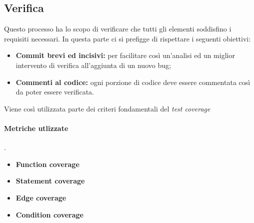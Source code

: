 \subsection{Verifica}
Questo processo ha lo scopo di verificare che tutti gli elementi soddisfino i requisiti necessari. In questa parte ci si prefigge di rispettare i seguenti obiettivi:
\begin{itemize}
	\item{\textbf{Commit brevi ed incisivi:} per facilitare così un'analisi ed un miglior intervento di verifica all'aggiunta di un nuovo bug;}
	\item{\textbf{Commenti al codice:} ogni porzione di codice deve essere commentata così da poter essere verificata.}
\end{itemize}
Viene così utilizzata parte dei criteri fondamentali del \textit{test coverage}
\paragraph{Metriche utlizzate}.
\begin{itemize}
	\item{\textbf{Function coverage}}
	\item{\textbf{Statement coverage}}
	\item{\textbf{Edge coverage}}
	\item{\textbf{Condition coverage}}
\end{itemize}
\begin{table}[!htpb]
\end{table}

